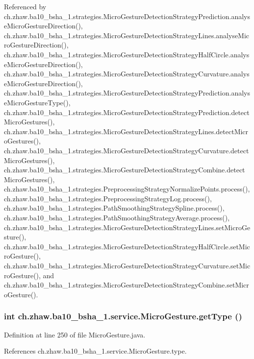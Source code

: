 Referenced by ch.zhaw.ba10\_\-bsha\_\-1.strategies.MicroGestureDetectionStrategyPrediction.analyseMicroGestureDirection(), ch.zhaw.ba10\_\-bsha\_\-1.strategies.MicroGestureDetectionStrategyLines.analyseMicroGestureDirection(), ch.zhaw.ba10\_\-bsha\_\-1.strategies.MicroGestureDetectionStrategyHalfCircle.analyseMicroGestureDirection(), ch.zhaw.ba10\_\-bsha\_\-1.strategies.MicroGestureDetectionStrategyCurvature.analyseMicroGestureDirection(), ch.zhaw.ba10\_\-bsha\_\-1.strategies.MicroGestureDetectionStrategyPrediction.analyseMicroGestureType(), ch.zhaw.ba10\_\-bsha\_\-1.strategies.MicroGestureDetectionStrategyPrediction.detectMicroGestures(), ch.zhaw.ba10\_\-bsha\_\-1.strategies.MicroGestureDetectionStrategyLines.detectMicroGestures(), ch.zhaw.ba10\_\-bsha\_\-1.strategies.MicroGestureDetectionStrategyCurvature.detectMicroGestures(), ch.zhaw.ba10\_\-bsha\_\-1.strategies.MicroGestureDetectionStrategyCombine.detectMicroGestures(), ch.zhaw.ba10\_\-bsha\_\-1.strategies.PreprocessingStrategyNormalizePoints.process(), ch.zhaw.ba10\_\-bsha\_\-1.strategies.PreprocessingStrategyLog.process(), ch.zhaw.ba10\_\-bsha\_\-1.strategies.PathSmoothingStrategySpline.process(), ch.zhaw.ba10\_\-bsha\_\-1.strategies.PathSmoothingStrategyAverage.process(), ch.zhaw.ba10\_\-bsha\_\-1.strategies.MicroGestureDetectionStrategyLines.setMicroGesture(), ch.zhaw.ba10\_\-bsha\_\-1.strategies.MicroGestureDetectionStrategyHalfCircle.setMicroGesture(), ch.zhaw.ba10\_\-bsha\_\-1.strategies.MicroGestureDetectionStrategyCurvature.setMicroGesture(), and ch.zhaw.ba10\_\-bsha\_\-1.strategies.MicroGestureDetectionStrategyCombine.setMicroGesture().\hypertarget{classch_1_1zhaw_1_1ba10__bsha__1_1_1service_1_1MicroGesture_a010dd89f21ef5ac1ed012ae1f4b7e80e}{
\subsubsection[{getType}]{\setlength{\rightskip}{0pt plus 5cm}int ch.zhaw.ba10\_\-bsha\_\-1.service.MicroGesture.getType ()}}
\label{classch_1_1zhaw_1_1ba10__bsha__1_1_1service_1_1MicroGesture_a010dd89f21ef5ac1ed012ae1f4b7e80e}


Definition at line 250 of file MicroGesture.java.

References ch.zhaw.ba10\_\-bsha\_\-1.service.MicroGesture.type.

